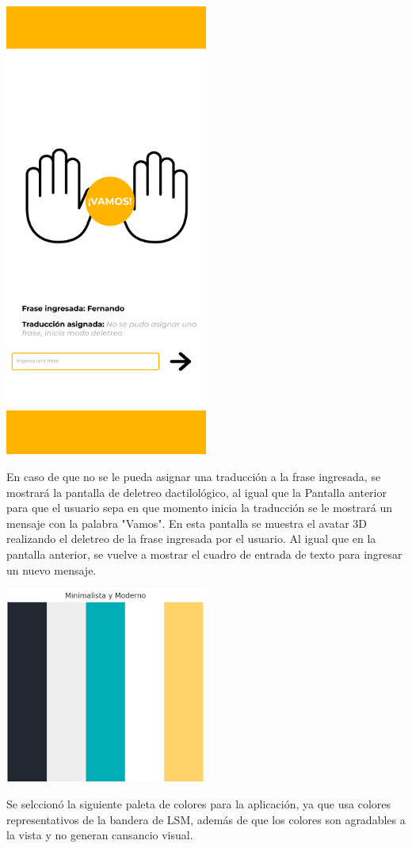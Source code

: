 \begin{center}
    \includegraphics[width=0.5\textwidth]{Images/Cap 3/Pantalla4.png}
\end{center}

En caso de que no se le pueda asignar una traducción a la frase ingresada, se mostrará la pantalla de deletreo dactilológico, al igual que la Pantalla anterior para que el usuario sepa en que momento inicia la traducción se le mostrará un mensaje con la palabra "Vamos". En esta pantalla se muestra el avatar 3D realizando el deletreo de la frase ingresada por el usuario. Al igual que en la pantalla anterior, se vuelve a mostrar el cuadro de entrada de texto para ingresar un nuevo mensaje.

\begin{center}
	\includegraphics[width=0.5\textwidth]{Images/Cap 3/Paleta.png}
\end{center}
Se selccionó la siguiente paleta de colores para la aplicación, ya que usa colores representativos de la bandera de LSM, además de que los colores son agradables a la vista y no generan cansancio visual.

